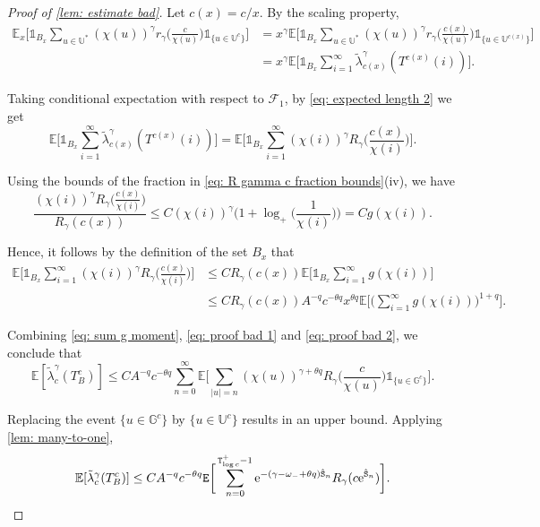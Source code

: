 \documentclass[12pt]{article}
\numberwithin{equation}{section}
\theoremstyle{plain}
\theoremstyle{definition}
\begin{document}
\begin{proof}[Proof of \cref{lem: estimate bad}]
\noindent Let $c(x) = c/x$. By the scaling property,
\begin{align}
\mathbb{E}_x\bigg[\mathds{1}_{B_x} \sum_{u\in\mathbb{U}^*} (\chi(u))^{\gamma}r_{\gamma}\Big(\frac{c}{\chi(u)}\Big) \mathds{1}_{\{u\in\mathbb{U}^c\}} \bigg]&= x^{\gamma}\mathbb{E}\bigg[\mathds{1}_{B_x} \sum_{u\in\mathbb{U}^*} (\chi(u))^{\gamma}r_{\gamma}\Big(\frac{c(x)}{\chi(u)}\Big)\mathds{1}_{\{u\in\mathbb{U}^{c(x)}\}} \bigg]\nonumber\\
&= x^{\gamma}\mathbb{E}\bigg[\mathds{1}_{B_x} \sum^{\infty}_{i=1} \tilde{\lambda}^{\gamma}_{c(x)}(T^{c(x)}(i))\bigg]. \label{eq: proof bad 1}
\end{align}

\noindent Taking conditional expectation with respect to $\mathcal{F}_1$, by \eqref{eq: expected length 2} we get
\[\mathbb{E}\bigg[\mathds{1}_{B_x} \sum^{\infty}_{i=1} \tilde{\lambda}^{\gamma}_{c(x)}(T^{c(x)}(i))\bigg] = \mathbb{E}\bigg[\mathds{1}_{B_x} \sum^{\infty}_{i=1} (\chi(i))^{\gamma}R_{\gamma}\Big(\frac{c(x)}{\chi(i)}\Big)\bigg].\]

\noindent Using the bounds of the fraction in \eqref{eq: R gamma c fraction bounds}(iv), we have
\begin{equation}\label{eq: frac bound by g}
\frac{(\chi(i))^{\gamma}R_{\gamma}\Big(\frac{c(x)}{\chi(i)}\Big)}{R_{\gamma}(c(x))} \leq C(\chi(i))^{\gamma}\Big(1 + \log_+\Big(\frac{1}{\chi(i)}\Big)\Big) = Cg(\chi(i)).
\end{equation}

\noindent Hence, it follows by the definition of the set $B_x$ that
\begin{align}
\mathbb{E}\bigg[\mathds{1}_{B_x} \sum^{\infty}_{i=1} (\chi(i))^{\gamma}R_{\gamma}\Big(\frac{c(x)}{\chi(i)}\Big)\bigg]&\leq CR_{\gamma}(c(x))\mathbb{E}\bigg[\mathds{1}_{B_x}\sum^{\infty}_{i=1}g(\chi(i))\bigg]\nonumber\\
&\leq CR_{\gamma}(c(x))A^{- q}c^{-\theta q}x^{\theta q}\mathbb{E}\bigg[\bigg(\sum^{\infty}_{i=1} g(\chi(i))\bigg)^{1+ q}\bigg]. \label{eq: proof bad 2}
\end{align}

\noindent Combining \eqref{eq: sum g moment}, \eqref{eq: proof bad 1} and \eqref{eq: proof bad 2}, we conclude that
\[\mathbb{E}[\tilde{\lambda}^{\gamma}_c(T^c_B)]\leq CA^{- q}c^{-\theta q}\sum^{\infty}_{n=0}\mathbb{E} \Bigg[\sum_{|u|=n}(\chi(u))^{\gamma+\theta q} R_{\gamma}\Big(\frac{c}{\chi(u)}\Big)\mathds{1}_{\{u\in\mathbb{G}^c\}}\Bigg]. \]

\noindent Replacing the event $\{u\in\mathbb{G}^c\}$ by $\{u\in \mathbb U^c\}$ results in an upper bound. Applying \cref{lem: many-to-one},
\[\mathbb{E}[\tilde{\lambda}^{\gamma}_c(T^c_B)]\leq CA^{- q}c^{-\theta q}{\tt E}\bigg[\sum^{{\tt T}_{\log c}^+-1}_{n=0} \mathrm{e}^{-(\gamma-\omega_-+\theta q){\hat{\tt S}}_n}R_{\gamma}(c\mathrm{e}^{\hat{\tt S}_n})\bigg].\]


\end{proof}
\end{document}
